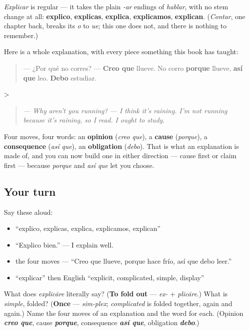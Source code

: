 \begin{grammarlens}[title={Grammar Lens: the shape of an explanation}]
\emph{Explicar} is regular — it takes the plain \emph{-ar} endings of \emph{hablar}, with no stem change at all: \textbf{explico}, \textbf{explicas}, \textbf{explica}, \textbf{explicamos}, \textbf{explican}. (\emph{Contar}, one chapter back, breaks its \emph{o} to \emph{ue}; this one does not, and there is nothing to remember.)

Here is a whole explanation, with every piece something this book has taught:

\begin{quote}
— ¿Por qué no corres? — \textbf{Creo que} llueve. No corro \textbf{porque} llueve, \textbf{así que} leo. \textbf{Debo} estudiar.
\end{quote}

>

\begin{quote}
\emph{— Why aren't you running?} \emph{— I think it's raining. I'm not running because it's raining, so I read. I ought to study.}
\end{quote}

Four moves, four words: an \textbf{opinion} (\emph{creo que}), a \textbf{cause} (\emph{porque}), a \textbf{consequence} (\emph{así que}), an \textbf{obligation} (\emph{debo}). That is what an explanation is made of, and you can now build one in either direction — cause first or claim first — because \emph{porque} and \emph{así que} let you choose.
\end{grammarlens}

\subsection*{Your turn}
Say these aloud:

\begin{itemize}
\raggedright
  \item \textquotedblleft{}explico, explicas, explica, explicamos, explican\textquotedblright{}
  \item \textquotedblleft{}Explico bien.\textquotedblright{} — I explain well.
  \item the four moves — \textquotedblleft{}Creo que llueve, porque hace frío, así que debo leer.\textquotedblright{}
  \item \textquotedblleft{}explicar\textquotedblright{} then English \textquotedblleft{}explicit, complicated, simple, display\textquotedblright{}
\end{itemize}

\begin{tcolorbox}[breakable,colback=teal!4,colframe=teal!35!black,title={Before you move on}]
What does \emph{explicāre} literally say? (\textbf{To fold out} — \emph{ex-} + \emph{plicāre}.) What is \emph{simple}, folded? (\textbf{Once} — \emph{sim-plex}; \emph{complicated} is folded together, again and again.) Name the four moves of an explanation and the word for each. (Opinion \emph{\textbf{creo que}}, cause \emph{\textbf{porque}}, consequence \emph{\textbf{así que}}, obligation \emph{\textbf{debo}}.)
\end{tcolorbox}
